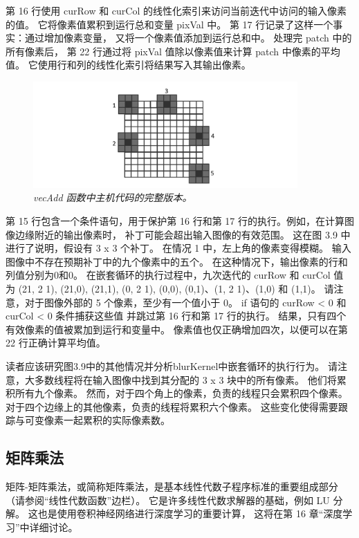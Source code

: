 第 16 行使用 curRow 和 curCol 的线性化索引来访问当前迭代中访问的输入像素的值。 
它将像素值累积到运行总和变量 pixVal 中。 第 17 行记录了这样一个事实：通过增加像素变量，
又将一个像素值添加到运行总和中。 处理完 patch 中的所有像素后，
第 22 行通过将 pixVal 值除以像素值来计算 patch 中像素的平均值。 它使用行和列的线性化索引将结果写入其输出像素。

\begin{figure}[H]
	\centering
	\includegraphics[width=0.9\textwidth]{figs/F3.9.png}
	\caption{\textit{\color{red} vecAdd 函数中主机代码的完整版本。}}
\end{figure}

第 15 行包含一个条件语句，用于保护第 16 行和第 17 行的执行。例如，在计算图像边缘附近的输出像素时，
补丁可能会超出输入图像的有效范围。 这在图 3.9 中进行了说明，假设有 3 x 3 个补丁。 在情况 1 中，左上角的像素变得模糊。 
输入图像中不存在预期补丁中的九个像素中的五个。 在这种情况下，输出像素的行和列值分别为0和0。 
在嵌套循环的执行过程中，九次迭代的 curRow 和 curCol 值
为 (21, 2 1), (21,0), (21,1), (0, 2 1), (0,0), (0,1)、(1, 2 1)、(1,0) 和 (1,1)。 
请注意，对于图像外部的 5 个像素，至少有一个值小于 0。 if 语句的 curRow < 0 和 curCol < 0 条件捕获这些值
并跳过第 16 行和第 17 行的执行。 结果，只有四个有效像素的值被累加到运行和变量中。 
像素值也仅正确增加四次，以便可以在第 22 行正确计算平均值。

读者应该研究图3.9中的其他情况并分析blurKernel中嵌套循环的执行行为。 
请注意，大多数线程将在输入图像中找到其分配的 3 x 3 块中的所有像素。 他们将累积所有九个像素。 
然而，对于四个角上的像素，负责的线程只会累积四个像素。 对于四个边缘上的其他像素，负责的线程将累积六个像素。 
这些变化使得需要跟踪与可变像素一起累积的实际像素数。

\subsection{矩阵乘法}
矩阵-矩阵乘法，或简称矩阵乘法，是基本线性代数子程序标准的重要组成部分（请参阅“线性代数函数”边栏）。 
它是许多线性代数求解器的基础，例如 LU 分解。 这也是使用卷积神经网络进行深度学习的重要计算，
这将在第 16 章“深度学习”中详细讨论。

